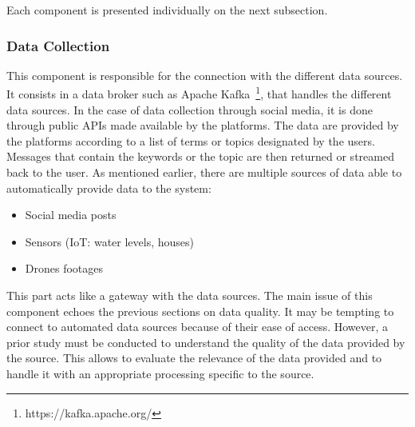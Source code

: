Each component is presented individually on the next subsection.

\subsubsection{Data Collection}
This component is responsible for the connection with the different data sources.
It consists in a data broker such as Apache Kafka~\footnote{https://kafka.apache.org/}, that handles the different data sources.
In the case of data collection through social media, it is done through public APIs made
available by the platforms.
The data are provided by the platforms according to a list of terms or topics designated by the users.
Messages that contain the keywords or the topic are then returned or streamed back to the user.
As mentioned earlier, there are multiple sources of data able to automatically provide data to the system:

\begin{itemize}
    \item Social media posts
    \item Sensors (IoT: water levels, houses)
    \item Drones footages
\end{itemize}

This part acts like a gateway with the data sources.
The main issue of this component echoes the previous sections on data quality.
It may be tempting to connect to automated data sources because of their ease of access.
However, a prior study must be conducted to understand the quality of the data provided by the source.
This allows to evaluate the relevance of the data provided and to handle it with an appropriate processing specific to the source.

